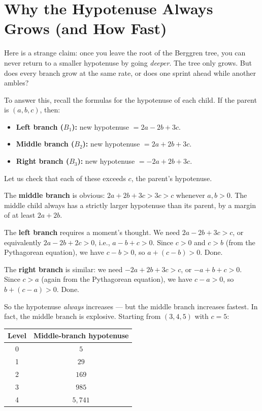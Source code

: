 \documentclass[11pt,openany]{book}
\theoremstyle{definition}
\theoremstyle{plain}
\theoremstyle{remark}
\begin{document}
\section*{Why the Hypotenuse Always Grows (and How Fast)}


Here is a strange claim: once you leave the root of the Berggren tree, you can never return to a smaller hypotenuse by going \textit{deeper}. The tree only grows. But does every branch grow at the same rate, or does one sprint ahead while another ambles?

To answer this, recall the formulas for the hypotenuse of each child. If the parent is $(a, b, c)$, then:

\begin{itemize}
\item \textbf{Left branch ($B_1$):} new hypotenuse $= 2a - 2b + 3c$.
\item \textbf{Middle branch ($B_2$):} new hypotenuse $= 2a + 2b + 3c$.
\item \textbf{Right branch ($B_3$):} new hypotenuse $= -2a + 2b + 3c$.
\end{itemize}

Let us check that each of these exceeds $c$, the parent's hypotenuse.

The \textbf{middle branch} is obvious: $2a + 2b + 3c > 3c > c$ whenever $a, b > 0$. The middle child always has a strictly larger hypotenuse than its parent, by a margin of at least $2a + 2b$.

The \textbf{left branch} requires a moment's thought. We need $2a - 2b + 3c > c$, or equivalently $2a - 2b + 2c > 0$, i.e., $a - b + c > 0$. Since $c > 0$ and $c > b$ (from the Pythagorean equation), we have $c - b > 0$, so $a + (c - b) > 0$. Done.

The \textbf{right branch} is similar: we need $-2a + 2b + 3c > c$, or $-a + b + c > 0$. Since $c > a$ (again from the Pythagorean equation), we have $c - a > 0$, so $b + (c - a) > 0$. Done.

So the hypotenuse \textit{always} increases — but the middle branch increases fastest. In fact, the middle branch is explosive. Starting from $(3, 4, 5)$ with $c = 5$:

\begin{center}
\begin{tabular}{c|c}
\toprule
Level & Middle-branch hypotenuse \\
\midrule
0 & $5$ \\
1 & $29$ \\
2 & $169$ \\
3 & $985$ \\
4 & $5{,}741$ \\
\bottomrule
\end{tabular}
\end{center}
\end{document}
